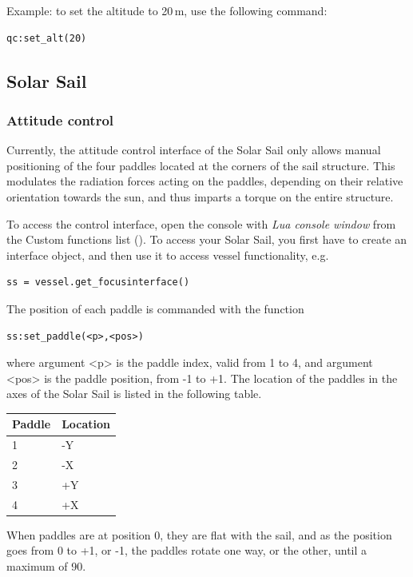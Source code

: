 \documentclass[Orbiter User Manual.tex]{subfiles}
\begin{document}
Example: to set the altitude to 20\,m, use the following command:

\begin{lstlisting}[language=OSFS]
qc:set_alt(20)
\end{lstlisting}


\subsection{Solar Sail}
\label{a_ssec:solar_sail}

\subsubsection{Attitude control}

Currently, the attitude control interface of the Solar Sail only allows manual
positioning of the four paddles located at the corners of the sail structure.
This modulates the radiation forces acting on the paddles, depending on their
relative orientation towards the sun, and thus imparts a torque on the entire
structure.

To access the control interface, open the console with \emph{Lua console
window} from the Custom functions list (). To access your
Solar Sail, you first have to create an interface object, and then use it to
access vessel functionality, e.g.

\begin{lstlisting}[language=OSFS]
ss = vessel.get_focusinterface()
\end{lstlisting}

The position of each paddle is commanded with the function

\begin{lstlisting}[language=OSFS]
ss:set_paddle(<p>,<pos>)
\end{lstlisting}

where argument <p> is the paddle index, valid from 1 to 4, and argument <pos> is
the paddle position, from -1 to +1. The location of the paddles in the axes of
the Solar Sail is listed in the following table.

	\begin{longtable}{ p{} p{} }
	\hline
	\textbf{Paddle} & \textbf{Location}\\
	\hline
	1 & -Y\\
	\hline
	2 & -X\\
	\hline
	3 & +Y\\
	\hline
	4 & +X\\
	\hline
	\end{longtable}

When paddles are at position 0, they are flat with the sail, and as the position
goes from 0 to +1, or -1, the paddles rotate one way, or the other, until a
maximum of 90\deg{}.
\end{document}
